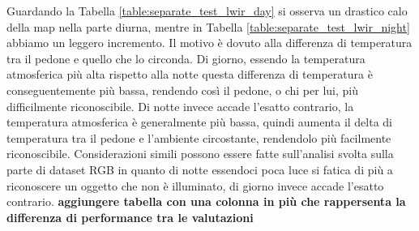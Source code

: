 \begin{table}[]
    \centering
    \caption{Risultati della valutazione separata}
    \label{table:separate_test_lwir_kaist}
\end{table}
Guardando la Tabella \ref{table:separate_test_lwir_day} si osserva un drastico calo della \ac{map} nella parte diurna, mentre in Tabella \ref{table:separate_test_lwir_night} abbiamo un leggero incremento. Il motivo è dovuto alla differenza di temperatura tra il pedone e quello che lo circonda. Di giorno, essendo la temperatura atmosferica più alta rispetto alla notte questa differenza di temperatura è conseguentemente più bassa, rendendo così il pedone, o chi per lui, più difficilmente riconoscibile. Di notte invece accade l'esatto contrario, la temperatura atmosferica è generalmente più bassa, quindi aumenta il delta di temperatura tra il pedone e l'ambiente circostante, rendendolo più facilmente riconoscibile. Considerazioni simili possono essere fatte sull'analisi svolta sulla parte di dataset RGB in quanto di notte essendoci poca luce si fatica di più a riconoscere un oggetto che non è illuminato, di giorno invece accade l'esatto contrario.
\textbf{aggiungere tabella con una colonna in più che rappersenta la differenza di performance tra le valutazioni}


